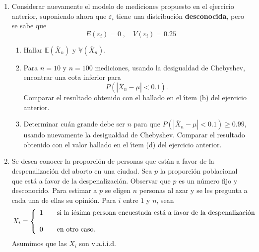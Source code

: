 \documentclass[11pt,a4paper,twoside]{article}%
\begin{document}
\begin{enumerate}

\item \label{medidas repetidas_bis} Considerar nuevamente el modelo de 
mediciones propuesto en el ejercicio anterior, suponiendo ahora que 
$\varepsilon_i$  tiene una distribuci\'{o}n \textbf{desconocida}, pero se sabe 
que 
$$E(\varepsilon_i)=0\;, \quad V(\varepsilon_i)=0.25$$


\begin{enumerate}
	\item Hallar $\mathbb{E}(\overline{X}_{n})$ y 
$\mathbb{V}(\overline{X}_{n})$.
	
	\item Para $n=10$ y $n=100$ mediciones, usando la desigualdad de Chebyshev,
	encontrar una cota inferior para
	\[
	P\left(  |\overline{X}_{n}-\mu|<0.1\right)  .
	\]
	Comparar el resultado obtenido con el hallado en el \'{\i}tem (b) del 
ejercicio anterior.
	
	\item Determinar cu\'an grande debe ser $n$ para que $P\left(  |\overline{X}%
	_{n}-\mu|<0.1\right)  \geq0.99$, usando nuevamente la desigualdad de Chebyshev.
		Comparar el resultado obtenido con el valor hallado en el \'{\i}tem 
(d) del ejercicio anterior.
	
\end{enumerate}


\item Se desea conocer la proporci\'{o}n de personas que est\'{a}n a favor de
la despenalizaci\'{o}n del aborto en una ciudad. Sea $p$ la proporci\'{o}n
poblacional que est\'{a} a favor de la despenalizaci\'{o}n. Observar que $p$ es
un n\'{u}mero fijo y desconocido. Para estimar a $p$ se eligen $n$ personas al
azar y se les pregunta a cada una de ellas su opini\'{o}n. Para $i$ entre $1$
y $n$, sean%
\[
X_{i}=\left\{
\begin{array}
[c]{lll}%
1 &  & \text{si la i\'{e}sima persona encuestada est\'{a} a favor de la
despenalizaci\'{o}n}\\
&  & \\
0 &  & \text{en otro caso.}%
\end{array}
\right.
\]
Asumimos que las $X_{i}$ son v.a.i.i.d.


\end{enumerate}
\end{document}
